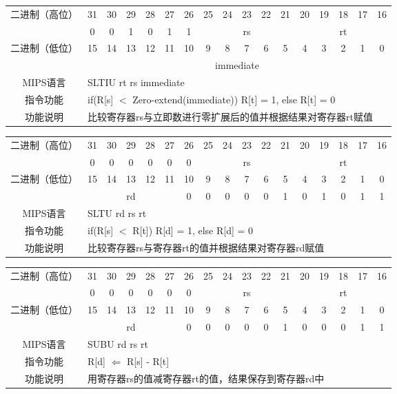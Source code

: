 \begin{table}
\begin{tabular}{|c|c|c|c|c|c|c|c|c|c|c|c|c|c|c|c|c|}
\hline
\multirow{2}{*}{二进制（高位）} &
31&30&29&28&27&26&25&24&23&22&21&20&19&18&17&16\\
\cline{2-17}
&0&0&1&0&1&1&
\multicolumn{5}{c|}{rs}&
\multicolumn{5}{c|}{rt}\\
\hline
\multirow{2}{*}{二进制（低位）} &
15&14&13&12&11&10&9&8&7&6&5&4&3&2&1&0\\
\cline{2-17}
&
\multicolumn{16}{c|}{immediate}\\
\hline
MIPS语言&
\multicolumn{16}{l|}{SLTIU rt rs immediate}\\
\hline
指令功能&
\multicolumn{16}{l|}{if(R[s] $<$ Zero-extend(immediate)) R[t] = 1, else R[t] = 0}\\
\hline
功能说明&
\multicolumn{16}{l|}{比较寄存器rs与立即数进行零扩展后的值并根据结果对寄存器rt赋值}\\
\hline
\end{tabular}
\end{table}

\begin{table}
\begin{tabular}{|c|c|c|c|c|c|c|c|c|c|c|c|c|c|c|c|c|}
\hline
\multirow{2}{*}{二进制（高位）} &
31&30&29&28&27&26&25&24&23&22&21&20&19&18&17&16\\
\cline{2-17}
&0&0&0&0&0&0&
\multicolumn{5}{c|}{rs}&
\multicolumn{5}{c|}{rt}\\
\hline
\multirow{2}{*}{二进制（低位）} &
15&14&13&12&11&10&9&8&7&6&5&4&3&2&1&0\\
\cline{2-17}
&
\multicolumn{5}{c|}{rd}&
0&0&0&0&0&1&0&1&0&1&1\\
\hline
MIPS语言&
\multicolumn{16}{l|}{SLTU rd rs rt}\\
\hline
指令功能&
\multicolumn{16}{l|}{if(R[s] $<$ R[t]) R[d] = 1, else R[d] = 0}\\
\hline
功能说明&
\multicolumn{16}{l|}{比较寄存器rs与寄存器rt的值并根据结果对寄存器rd赋值}\\
\hline
\end{tabular}
\end{table}

\begin{table}
\begin{tabular}{|c|c|c|c|c|c|c|c|c|c|c|c|c|c|c|c|c|}
\hline
\multirow{2}{*}{二进制（高位）} &
31&30&29&28&27&26&25&24&23&22&21&20&19&18&17&16\\
\cline{2-17}
&0&0&0&0&0&0&
\multicolumn{5}{c|}{rs}&
\multicolumn{5}{c|}{rt}\\
\hline
\multirow{2}{*}{二进制（低位）} &
15&14&13&12&11&10&9&8&7&6&5&4&3&2&1&0\\
\cline{2-17}
&
\multicolumn{5}{c|}{rd}&
0&0&0&0&0&1&0&0&0&1&1\\
\hline
MIPS语言&
\multicolumn{16}{l|}{SUBU rd rs rt}\\
\hline
指令功能&
\multicolumn{16}{l|}{R[d] $\Leftarrow$ R[s] - R[t]}\\
\hline
功能说明&
\multicolumn{16}{l|}{用寄存器rs的值减寄存器rt的值，结果保存到寄存器rd中}\\
\hline
\end{tabular}
\end{table}

